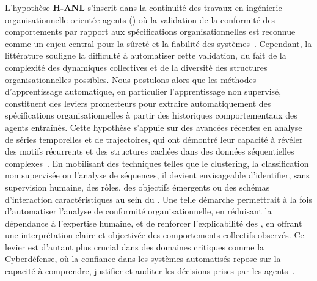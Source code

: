 \medskip

\noindent L'hypothèse \textbf{H-ANL} s'inscrit dans la continuité des travaux en ingénierie organisationnelle orientée agents () où la validation de la conformité des comportements par rapport aux spécifications organisationnelles est reconnue comme un enjeu central pour la sûreté et la fiabilité des systèmes~\cite{Boella2006, Picard2009reorganisation}. Cependant, la littérature souligne la difficulté à automatiser cette validation, du fait de la complexité des dynamiques collectives et de la diversité des structures organisationnelles possibles. Nous postulons alors que les méthodes d'apprentissage automatique, en particulier l'apprentissage non supervisé, constituent des leviers prometteurs pour extraire automatiquement des spécifications organisationnelles à partir des historiques comportementaux des agents entraînés. Cette hypothèse s'appuie sur des avancées récentes en analyse de séries temporelles et de trajectoires, qui ont démontré leur capacité à révéler des motifs récurrents et des structures cachées dans des données séquentielles complexes~\cite{Zhang2021, Gunning2019}. En mobilisant des techniques telles que le clustering, la classification non supervisée ou l'analyse de séquences, il devient envisageable d'identifier, sans supervision humaine, des rôles, des objectifs émergents ou des schémas d'interaction caractéristiques au sein du . Une telle démarche permettrait à la fois d'automatiser l'analyse de conformité organisationnelle, en réduisant la dépendance à l'expertise humaine, et de renforcer l'explicabilité des , en offrant une interprétation claire et objectivée des comportements collectifs observés. Ce levier est d'autant plus crucial dans des domaines critiques comme la Cyberdéfense, où la confiance dans les systèmes automatisés repose sur la capacité à comprendre, justifier et auditer les décisions prises par les agents~\cite{Gunning2019}.

\medskip


